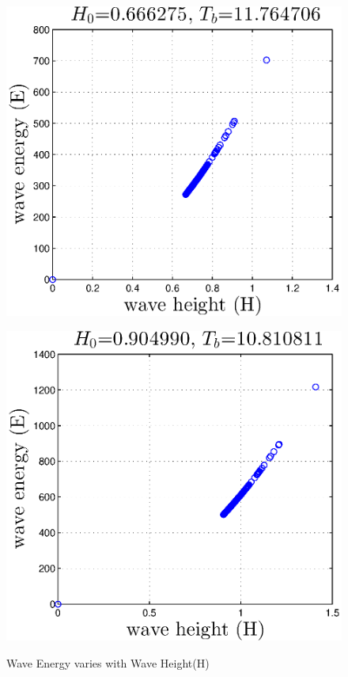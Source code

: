 
\begin{figure}[H]
\begin{minipage}[b]{0.47\linewidth}
\centering
\includegraphics[width=\textwidth]{forward_plot/p1_6.eps}
\label{FigE_11}
\end{minipage}
\hspace{0.4cm}
\begin{minipage}[b]{0.47\linewidth}
\centering
\includegraphics[width=\textwidth]{forward_plot/p2_6.eps}
\label{FigE_21}
\end{minipage}
\caption{Wave Energy varies with Wave Height(H)}
\end{figure}

